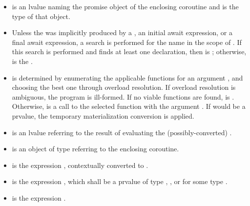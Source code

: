 \begin{itemize}
\item
{} is an lvalue naming the promise
object
of the enclosing coroutine and  is the type of that object.

\item Unless
the  was implicitly produced by
a ,
an initial await expression,
or a final await expression,
a search is performed for the name 
in the scope of .
If this search is performed and finds at least one declaration,
then  is
\mbox{\tcode{)}};
otherwise,  is the  .

\item
{} is determined by enumerating the applicable
 functions for an argument
, and choosing the best one through
overload resolution. If overload resolution is ambiguous,
the program is ill-formed.
If no viable functions are found,  is .
Otherwise,  is a call to the selected function
with the argument .
If  would be a prvalue,
the temporary materialization conversion is applied.

\item
{} is an lvalue
referring to the result of evaluating
the (possibly-converted) .

\item
 is an object of type
referring to the enclosing coroutine.

\item
{} is the expression
,
contextually converted to .

\item
{} is the expression
\tcode{)},
which shall be a prvalue of type , , or
 for some type .

\item
{} is the expression
.
\end{itemize}

